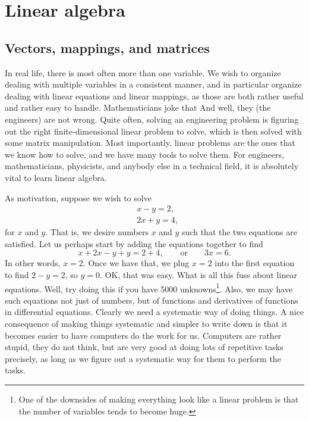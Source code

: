 \chapter{Linear algebra} \label{linalg:appendix}


\section{Vectors, mappings, and matrices}
\label{vecsandmaps:section}



In real life, there is most often more than one variable.
We wish to organize dealing with multiple variables in a consistent
manner, and in particular organize dealing with linear equations and linear
mappings, as those are both rather useful and rather easy to handle.
Mathematicians joke that
And well, they (the engineers) are not wrong. 
Quite often, solving an engineering problem is figuring out the
right finite-dimensional linear problem to solve, which is then
solved with some matrix manipulation.
Most importantly, linear problems are the ones that we know how to solve,
and we have many tools to solve them.
For engineers, mathematicians, physicists, and anybody else in a technical
field, it is absolutely vital to learn linear algebra.

As motivation, suppose we wish to solve
\begin{equation*}
\begin{aligned}
& x-y = 2 , \\
& 2x+y = 4 ,
\end{aligned}
\end{equation*}
for $x$ and $y$.
That is, we desire numbers $x$ and $y$ such that the two
equations are satisfied.
Let us perhaps start by adding the equations together to find
\begin{equation*}
x+2x-y+y = 2+4, \qquad \text{or} \qquad 3x = 6 .
\end{equation*}
In other words, $x=2$.  Once we have that, we plug $x=2$ into the
first equation to find $2-y=2$, so $y=0$.  OK\@, that was easy.  What is all
this fuss about linear equations.  Well, try doing this if you have
5000 unknowns\footnote{One of the downsides of making everything look like a
linear problem is that the number of variables tends to become huge.}.
Also, we may have such equations not just of numbers,
but of functions and derivatives of functions in differential equations.
Clearly we need a systematic way of doing things.
A nice consequence of making things systematic and simpler to write down
is that it becomes easier to have computers do the work for us.
Computers are rather stupid, they do not think,
but are very good at doing lots of repetitive
tasks precisely, as long as we figure out a systematic way for them to
perform the tasks.

